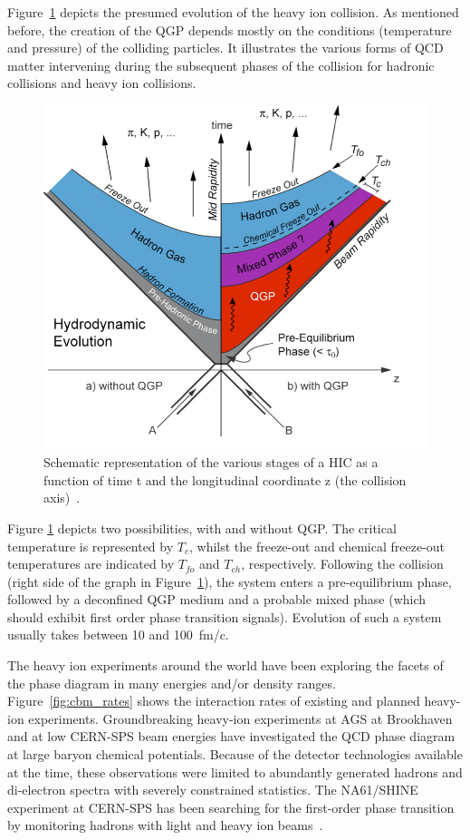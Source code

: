 Figure~\ref{fig_heavyion} depicts the presumed evolution of the heavy ion collision. As mentioned before, the creation of the \gls{QGP} depends mostly on the conditions (temperature and pressure) of the colliding particles. It illustrates the various forms of QCD matter intervening during the subsequent phases of the collision for hadronic collisions and heavy ion collisions.
\begin{figure}[!h]
\centering
 \includegraphics[width=0.6\columnwidth]{Chapter1/images/heavyion.png}
\caption{Schematic representation of the various stages of a HIC as a function of time t and the longitudinal coordinate z (the collision axis)~\cite{Sahoo:2745520}.}
\label{fig_heavyion}
\end{figure}

Figure \ref{fig_heavyion} depicts two possibilities, with and without \gls{QGP}. The critical temperature is represented by $T_c$, whilst the freeze-out and chemical freeze-out temperatures are indicated by $T_{fo}$ and $T_{ch}$, respectively. Following the collision (right side of the graph in Figure~\ref{fig_heavyion}), the system enters a pre-equilibrium phase, followed by a deconfined QGP medium and a probable mixed phase (which should exhibit first order phase transition signals). Evolution of such a system usually takes between 10 and 100~fm/c. 

The heavy ion experiments around the world have been exploring the facets of the phase diagram in many energies and/or density ranges. Figure~\ref{fig:cbm_rates} shows the interaction rates of existing and planned heavy-ion experiments. Groundbreaking heavy-ion experiments at AGS at Brookhaven and at low CERN-SPS beam energies have investigated the QCD phase diagram at large baryon chemical potentials. Because of the detector technologies available at the time, these observations were limited to abundantly generated hadrons and di-electron spectra with severely constrained statistics. The NA61/SHINE experiment at CERN-SPS has been searching for the first-order phase transition by monitoring hadrons with light and heavy ion beams~\cite{CBM_physics, Turko:2301677}.

